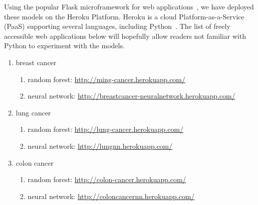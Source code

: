 \documentclass[a4paper,11pt]{article}
\begin{document}

Using the popular Flask microframework for web applications~\cite{flask}, we have deployed these models 
on the Heroku Platform. Heroku is a cloud Platform-as-a-Service (PaaS) supporting several languages, including Python~\cite{heroku}. The list of freely accessible web applications below will hopefully allow readers not familiar with Python to experiment with the models. 


\begin{enumerate}[noitemsep]
\item breast cancer 
    \begin{enumerate}[noitemsep]
    \item random forest: \url{http://ming-cancer.herokuapp.com/}
    \item neural network: \url{http://breastcancer-neuralnetwork.herokuapp.com/}
    \end{enumerate}
\item lung cancer
   \begin{enumerate}[noitemsep]
   \item random forest: \url{http://lung-cancer.herokuapp.com/}
   \item neural network: \url{http://lungnn.herokuapp.com/}
    \end{enumerate}
\item colon cancer
  \begin{enumerate}[noitemsep]
   \item random forest: \url{http://colon-cancer.herokuapp.com/}
   \item neural network: \url{http://coloncancernn.herokuapp.com/}
   \end{enumerate}
\end{enumerate}
\end{document}
